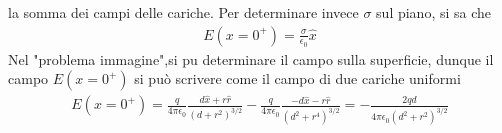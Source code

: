 \documentclass[a4paper, oneside]{article}
\begin{document}
la somma dei campi delle cariche. Per determinare invece $\sigma$ sul piano, si sa che 
\begin{gather*}
    E(x = 0^{+}) = \frac{\sigma}{\epsilon_0} \hat{x} 
\end{gather*}
Nel "problema immagine",si pu determinare il campo sulla superficie, dunque il campo 
$E(x = 0^{+})$ si può scrivere come il campo di due cariche uniformi 
\begin{gather*}
    E(x = 0^{+}) = \frac{q}{4\pi\epsilon_0} \frac{d\hat{x} + r \hat{r}  }{(d + r^{2})^{3/2}} - \frac{q}{4\pi\epsilon_0} \frac{-d\hat{x} - r\hat r  }{(d^{2} + r^{4})^{3/2}} = -\frac{2qd}{4\pi\epsilon_0 (d^{2} + r^{2})^{3/2}}
\end{gather*}
\end{document}
